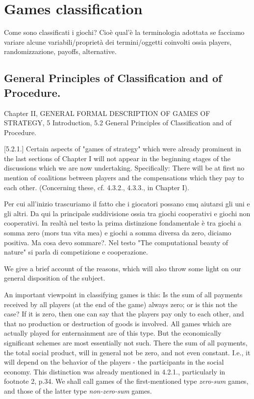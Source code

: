\chapter{Games classification}
Come sono classificati i giochi? Cio\`e qual'\`e la terminologia adottata se facciamo variare alcune variabili/propriet\`a dei termini/oggetti coinvolti ossia players, randomizzazione, payoffs, alternative.

\section{General Principles of Classification and of Procedure. \cite{vonNeumann1944}}
Chapter II, GENERAL FORMAL DESCRIPTION OF GAMES OF STRATEGY, 5 Introduction, 5.2 General Principles of Classification and of Procedure.

[5.2.1.] Certain aspects of "games of strategy" which were already prominent in the last sections of Chapter I will not appear in the beginning stages of the discussions which we are now undertaking. Specifically: There will be at first no mention of coalitions between players and the compensations which they pay to each other. (Concerning these, cf. 4.3.2., 4.3.3., in Chapter I).

Per cui all'inizio trascuriamo il fatto che i giocatori possano cmq aiutarsi gli uni e gli altri. Da qui la principale suddivisione ossia tra giochi cooperativi e giochi non cooperativi. In realt\`a nel testo \cite{vonNeumann1944} la prima distinzione fondamentale \`e tra giochi a somma zero (mors tua vita mea) e giochi a somma diversa da zero, diciamo positiva. Ma cosa devo sommare?. Nel testo "The computational beauty of nature" si parla di competizione e cooperazione.

We give a brief account of the reasons, which will also throw some light on our general disposition of the subject.

An important viewpoint in classifying games is this: Is the sum of all payments received by all players (at the end of the game) always zero; or is this not the case? If it is zero, then one can say that the players pay only to each other, and that no production or destruction of goods is involved. All games which are actually played for enternainment are of this type. But the economically significant schemes are most essentially not such. There the sum of all payments, the total social product, will in general not be zero, and not even constant. I.e., it will depend on the behavior of the players - the participants in the social economy. This distinction was already mentioned in 4.2.1., particularly in footnote 2, p.34. We shall call games of the first-mentioned type \emph{zero-sum} games, and those of the latter type \emph{non-zero-sum} games.

